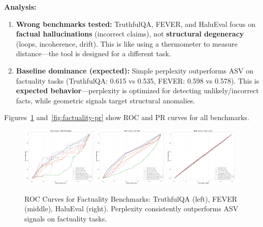 \documentclass[11pt]{article}
\begin{document}
\textbf{Analysis:}
\begin{enumerate}
\item \textbf{Wrong benchmarks tested:} TruthfulQA, FEVER, and HaluEval focus on \textbf{factual hallucinations} (incorrect claims), not \textbf{structural degeneracy} (loops, incoherence, drift). This is like using a thermometer to measure distance---the tool is designed for a different task.
\item \textbf{Baseline dominance (expected):} Simple perplexity outperforms ASV on factuality tasks (TruthfulQA: 0.615 vs 0.535, FEVER: 0.598 vs 0.578). This is \textbf{expected behavior}---perplexity is optimized for detecting unlikely/incorrect facts, while geometric signals target structural anomalies.
\end{enumerate}

Figures~\ref{fig:factuality-roc} and~\ref{fig:factuality-pr} show ROC and PR curves for all benchmarks.

\begin{figure}[h]
\centering
\includegraphics[width=0.32\textwidth]{figures/truthfulqa_roc_curves.png}
\includegraphics[width=0.32\textwidth]{figures/fever_roc_curves.png}
\includegraphics[width=0.32\textwidth]{figures/halueval_roc_curves.png}
\caption{ROC Curves for Factuality Benchmarks: TruthfulQA (left), FEVER (middle), HaluEval (right). Perplexity consistently outperforms ASV signals on factuality tasks.}
\label{fig:factuality-roc}
\end{figure}
\end{document}
